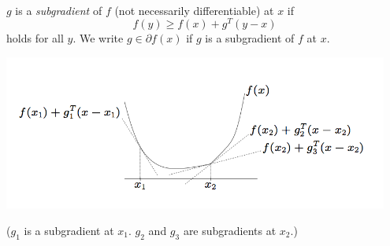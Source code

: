 \\
$g$ is a \emph{subgradient} of $f$ (not necessarily differentiable) at $x$ if
\begin{equation*}
f(y) \geq f(x) + g^T(y-x)
\end{equation*}
holds for all $y$. We write $g \in \partial f(x)$ if $g$ is a subgradient of $f$ at $x$.

\begin{center}
\includegraphics[width=0.95\textwidth]{poster/subgrad_figure}
\end{center}

($g_1$ is a subgradient at $x_1$. $g_2$ and $g_3$ are subgradients at
$x_2$.)